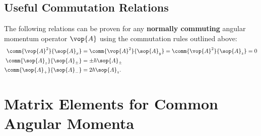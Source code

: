 \subsection{Useful Commutation Relations}

The following relations can be proven for any \textbf{normally commuting} angular momentum operator $\vop{A}$ using the commutation rules outlined above:
\begin{align*}
    \comm{\vop{A}^2}{\sop{A}_x}   & = \comm{\vop{A}^2}{\sop{A}_y} = \comm{\vop{A}^2}{\sop{A}_z} = 0 \\
    \comm{\sop{A}_z}{\sop{A}_\pm} & = \pm\hbar\sop{A}_\pm                                           \\
    \comm{\sop{A}_+}{\sop{A}_-}   & = 2\hbar\sop{A}_z.
\end{align*}

\section{Matrix Elements for Common Angular Momenta}


